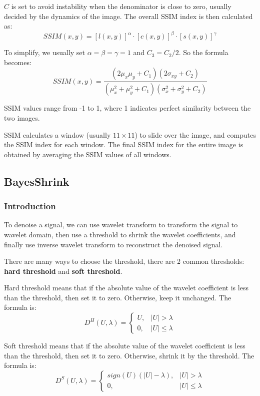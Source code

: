 \documentclass[12pt]{ctexart}
\begin{document}
$C$ is set to avoid instability when the denominator is close to zero, usually decided by
the dynamics of the image. The overall SSIM index is then calculated as:
\[
  SSIM(x,y) = [l(x,y)]^\alpha \cdot [c(x,y)]^\beta \cdot [s(x,y)]^\gamma
\]

To simplify, we usually set $\alpha = \beta = \gamma = 1$ and $C_3 = C_2/2$. So the formula
becomes:
\[
  SSIM(x,y) = \frac{(2\mu_x \mu_y + C_1)(2\sigma_{xy} + C_2)}{(\mu_x^2 + \mu_y^2 + C_1)
  (\sigma_x^2 + \sigma_y^2 + C_2)}
\]

SSIM values range from -1 to 1, where 1 indicates perfect similarity between the two images.

SSIM calculates a window (usually $11 \times 11$) to slide over the image, and
computes the SSIM index for each window. The final SSIM index for the entire image
is obtained by averaging the SSIM values of all windows.

\subsection{\textbf{BayesShrink}}
\subsubsection{\textbf{Introduction}}

To denoise a signal, we can use wavelet transform to transform the signal to wavelet
domain, then use a threshold to shrink the wavelet coefficients, and finally use inverse
wavelet transform to reconstruct the denoised signal.

There are many ways to choose the threshold, there are 2 common thresholds: \textbf{hard
threshold} and \textbf{soft threshold}.

Hard threshold means that if the absolute value of the wavelet coefficient is less than the
threshold, then set it to zero. Otherwise, keep it unchanged. The formula is:
\[
  D^H(U, \lambda) = \begin{cases}
    U, & |U| > \lambda \\
    0, & |U| \leq \lambda
  \end{cases}
\]

Soft threshold means that if the absolute value of the wavelet coefficient is less than the
threshold, then set it to zero. Otherwise, shrink it by the threshold. The formula is:
\[
  D^S(U, \lambda) = \begin{cases}
    sign(U)(|U| - \lambda), & |U| > \lambda \\
    0, & |U| \leq \lambda
  \end{cases}
\]
\end{document}
